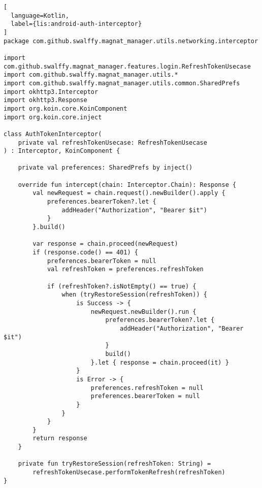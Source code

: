 \begin{lstlisting}[
  language=Kotlin,
  label={lis:android-auth-interceptor}
]
package com.github.swalffy.magnat_manager.utils.networking.interceptor

import com.github.swalffy.magnat_manager.features.login.RefreshTokenUsecase
import com.github.swalffy.magnat_manager.utils.*
import com.github.swalffy.magnat_manager.utils.common.SharedPrefs
import okhttp3.Interceptor
import okhttp3.Response
import org.koin.core.KoinComponent
import org.koin.core.inject

class AuthTokenInterceptor(
    private val refreshTokenUsecase: RefreshTokenUsecase
) : Interceptor, KoinComponent {

    private val preferences: SharedPrefs by inject()

    override fun intercept(chain: Interceptor.Chain): Response {
        val newRequest = chain.request().newBuilder().apply {
            preferences.bearerToken?.let {
                addHeader("Authorization", "Bearer $it")
            }
        }.build()

        var response = chain.proceed(newRequest)
        if (response.code() == 401) {
            preferences.bearerToken = null
            val refreshToken = preferences.refreshToken

            if (refreshToken?.isNotEmpty() == true) {
                when (tryRestoreSession(refreshToken)) {
                    is Success -> {
                        newRequest.newBuilder().run {
                            preferences.bearerToken?.let {
                                addHeader("Authorization", "Bearer $it")
                            }
                            build()
                        }.let { response = chain.proceed(it) }
                    }
                    is Error -> {
                        preferences.refreshToken = null
                        preferences.bearerToken = null
                    }
                }
            }
        }
        return response
    }

    private fun tryRestoreSession(refreshToken: String) =
        refreshTokenUsecase.performTokenRefresh(refreshToken)
}
\end{lstlisting}